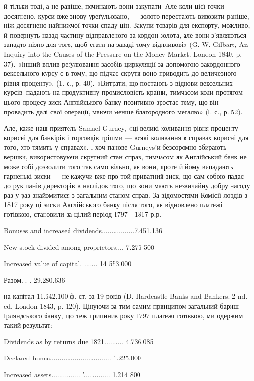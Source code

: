 й тільки тоді, а не раніше, починають вони закупати. Але коли цієї точки досягнено,
курси вже знову уреґульовано, — золото перестають вивозити раніше, ніж досягнено
найнижчої точки спаду цін. Закупи товарів для експорту, можливо, й повернуть
назад частину відправленого за кордон золота, але вони з’являються занадто
пізно для того, щоб стати на заваді тому відпливові» (G. W. Gilbart, An Inquiry
into the Causes of the Pressure on the Money Market. London 1840, p. 37). «Інший
вплив реґулювання засобів циркуляції за допомогою закордонного вексельного
курсу є в тому, що підчас скрути воно приводить до величезного рівня проценту».
(1. с., р. 40). «Витрати, що постають з віднови вексельних курсів,
падають на продуктивну промисловість країни, тимчасом коли протягом цього
процесу зиск Англійського банку позитивно зростає тому, що він провадить
далі свої операції, маючи менше благородного металю» (І. с., р. 52).

Але, каже наш приятель Samuel Gurney, «ці великі коливання рівня
проценту корисні для банкірів і торговців грішми — всякі коливання в справах
корисні для того, хто тямить у справах». І хоч панове Gurneys’и безсоромно збирають
вершки, використовуючи скрутний стан справ, тимчасом як Англійський
банк не може собі дозволити того так само вільно, як вони, проте й йому випадають
гарненькі зиски — не кажучи вже про той приватний зиск, що сам собою падає
до рук панів директорів в наслідок того, що вони мають незвичайну добру
нагоду раз-у-раз знайомитися з загальним станом справ. За відомостями Комісії
лордів з 1817 року ці зиски Англійського банку після того, як відновлено
платежі готівкою, становили за цілий період 1797—1817 р.р.:

Bonuses and increased dividends.................7.451.136

New stock divided among proprietors.... 7.276 500

Increased value of capital.    ....... 14 553.000

Разом. . . 29.280.636

на капітал 11.642.100 ф. ст. за 19 років (D. Hardcastle Banks and Bankers. 2-nd.
ed. London 1843, p. 120). Цінуючи за тим самим принципом загальний бариш
Ірляндського банку, що теж припинив року 1797 платежі готівкою, ми одержим
такий результат:

Dividends as by returns due 1821.......... 4.736.085

Declared bonus................................ 1.225.000

Increased assets............... '.............. 1.214 800

